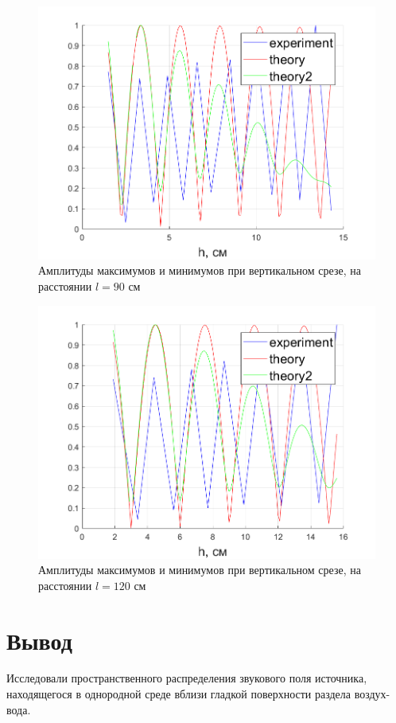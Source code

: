 \begin{figure}[H]
	\centering
	\includegraphics[width =0.7\linewidth]{pic/z3_2th}
	\caption{Амплитуды максимумов и минимумов при вертикальном срезе, на расстоянии $l=90$ см}
	\label{fig:task32th}
\end{figure}

\begin{figure}[H]
	\centering
	\includegraphics[width =0.7\linewidth]{pic/z3_3th}
	\caption{Амплитуды максимумов и минимумов при вертикальном срезе, на расстоянии $l=120$ см}
	\label{fig:task33th}
\end{figure}

\section{Вывод}
Исследовали пространственного распределения звукового поля источника, находящегося в однородной среде вблизи гладкой поверхности раздела воздух-вода.

